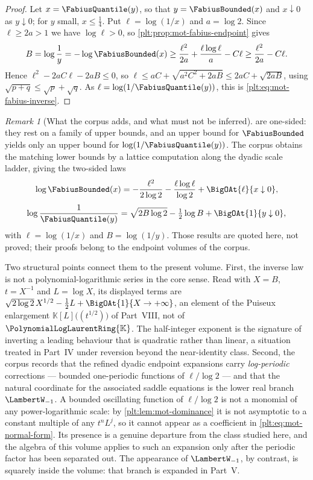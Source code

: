 \documentclass[11pt,oneside]{article}
\theoremstyle{plain}
\theoremstyle{definition}
\theoremstyle{remark}
\newtheorem{remark}[theorem]{Remark}
\newcommand{\K}{\mathbb{K}}
\newcommand{\PLlau}{\PolynomialLogLaurentRing{\K}}       %
\begin{document}
\begin{proof}
Let \(x=\FabiusQuantile(y)\), so that \(y=\FabiusBounded(x)\) and
\(x\downarrow0\) as \(y\downarrow0\); for \(y\) small, \(x\le\tfrac14\).  Put
\(\ell=\log(1/x)\) and \(a=\log2\).  Since \(\ell\ge2a>1\) we have
\(\log\ell>0\), so \cref{plt:prop:mot-fabius-endpoint} gives
\[
  B=\log\frac{1}{y}=-\log\FabiusBounded(x)
   \ge\frac{\ell^{2}}{2a}+\frac{\ell\log\ell}{a}-C\ell
   \ge\frac{\ell^{2}}{2a}-C\ell .
\]
Hence \(\ell^{2}-2aC\ell-2aB\le0\), so
\(\ell\le aC+\sqrt{a^{2}C^{2}+2aB}\le2aC+\sqrt{2aB}\), using
\(\sqrt{p+q}\le\sqrt p+\sqrt q\).  As \(\ell=\log(1/\FabiusQuantile(y))\), this
is \eqref{plt:eq:mot-fabius-inverse}.
\end{proof}

\begin{remark}[What the corpus adds, and what must not be inferred]
\label{plt:rmk:mot-fabius-status}
 are one-sided:
they rest on a family of upper bounds, and an upper bound for
\(\FabiusBounded\) yields only an upper bound for
\(\log(1/\FabiusQuantile(y))\).  The corpus obtains the matching lower bounds
by a lattice computation along the dyadic scale ladder, giving the two-sided
laws
\[
  \log\FabiusBounded(x)=-\frac{\ell^{2}}{2\log2}
   -\frac{\ell\log\ell}{\log2}+\BigOAt{\ell}{x\downarrow0},
\]
\[
  \log\frac{1}{\FabiusQuantile(y)}=\sqrt{2B\log2}-\tfrac12\log B
   +\BigOAt{1}{y\downarrow0},
\]
with \(\ell=\log(1/x)\) and \(B=\log(1/y)\).  Those results are quoted here,
not proved; their proofs belong to the endpoint volumes of the corpus.

Two structural points connect them to the present volume.  First, the inverse
law is not a polynomial-logarithmic series in the core sense.  Read with
\(X=B\), \(t=X^{-1}\) and \(L=\log X\), its displayed terms are
\(\sqrt{2\log2}\,X^{1/2}-\tfrac12L+\BigOAt{1}{X\to+\infty}\), an element of the
Puiseux enlargement \(\K[L]\bigl((t^{1/2})\bigr)\) of Part~VIII, not of
\(\PLlau\).  The half-integer exponent is the signature of inverting a leading
behaviour that is quadratic rather than linear, a situation treated in Part~IV
under reversion beyond the near-identity class.  Second, the corpus records
that the refined dyadic endpoint expansions carry \emph{log-periodic}
corrections --- bounded one-periodic functions of \(\ell/\log2\) --- and that
the natural coordinate for the associated saddle equations is the lower real
branch \(\LambertW_{-1}\).  A bounded oscillating function of \(\ell/\log2\) is
not a monomial of any power-logarithmic scale: by
\cref{plt:lem:mot-dominance} it is not asymptotic to a constant multiple of any
\(t^{n}L^{j}\), so it cannot appear as a coefficient in
\eqref{plt:eq:mot-normal-form}.  Its presence is a genuine departure from the
class studied here, and the algebra of this volume applies to such an expansion
only after the periodic factor has been separated out.  The appearance of
\(\LambertW_{-1}\), by contrast, is squarely inside the volume: that branch is
expanded in Part~V.
\end{remark}
\end{document}

